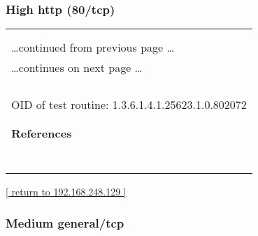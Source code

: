 \documentclass{article}
\begin{document}
\subsubsection{High http (80/tcp)}
\label{port:192.168.248.129 http (80/tcp) High}

\begin{longtable}{|p{}|}
\hline
\rowcolor{openvas_hole}{\color{white}{High (CVSS: 7.5) }}\\
\rowcolor{openvas_hole}{\color{white}{NVT: Lighttpd Multiple vulnerabilities}}\\
\hline
\endfirsthead
\hfill\ldots continued from previous page \ldots \\
\hline
\endhead
\hline
\ldots continues on next page \ldots \\
\endfoot
\hline
\endlastfoot
\\
\rowcolor{white}{\verb==}\\
\rowcolor{white}{\verb==}\\
\\
OID of test routine: 1.3.6.1.4.1.25623.1.0.802072\\
\\

      \hline
      \\
\textbf{References}\\
\rowcolor{white}{\verb=CVE: CVE-2014-2323, CVE-2014-2324=}\\
\rowcolor{white}{\verb=BID:66153, 66157=}\\
\rowcolor{white}{\verb=Other:=}\\
\rowcolor{white}{\verb=  URL:http://osvdb.org/104381=}\\
\rowcolor{white}{\verb=   URL:http://osvdb.org/104382=}\\
\rowcolor{white}{\verb=   URL:http://seclists.org/oss-sec/2014/q1/561=}\\
\rowcolor{white}{\verb=   URL:http://download.lighttpd.net/lighttpd/security/lighttpd_sa_2014_01.txt=}\\
\end{longtable}

\begin{footnotesize}\hyperref[host:192.168.248.129]{[ return to 192.168.248.129 ]}\end{footnotesize}
\subsubsection{Medium general/tcp}
\label{port:192.168.248.129 general/tcp Medium}
\end{document}
